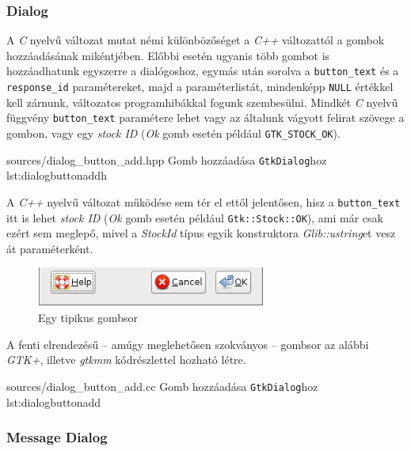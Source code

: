 \subsubsection{Dialog}
\label{sec:dialogbuttonadd}

A \textit{C} nyelvű változat mutat némi különbözőséget a \textit{C++} változattól a gombok hozzáadásának mikéntjében. Előbbi esetén ugyanis több gombot is hozzáadhatunk egyszerre a dialógoshoz, egymás után sorolva a \texttt{button\_text} és a \texttt{response\_id} paramétereket, majd a paraméterlistát, mindenképp \texttt{NULL} értékkel kell zárnunk, változatos programhibákkal fogunk szembesülni. Mindkét \textit{C} nyelvű függvény \texttt{button\_text} paramétere lehet vagy az általunk vágyott felirat szövege a gombon, vagy egy \textit{stock ID} (\textit{Ok} gomb esetén például \texttt{GTK\_STOCK\_OK}).

{sources/dialog_button_add.hpp}
{Gomb hozzáadása \texttt{GtkDialog}hoz}
{lst:dialogbuttonaddh}

A \textit{C++} nyelvű változat működése sem tér el ettől jelentősen, hisz a \texttt{button\_text} itt is lehet \textit{stock ID} (\textit{Ok} gomb esetén például \texttt{Gtk::Stock::OK}), ami már csak ezért sem meglepő, mivel a \textit{StockId} típus egyik konstruktora \textit{Glib::ustring}et vesz át paraméterként.

\begin{figure}[H]
\begin{center}
\includegraphics[height=13mm]{images/button-alternate.png}
\caption{Egy tipikus gombsor}
\end{center}
\end{figure}

A fenti elrendezésű -- amúgy meglehetősen szokványos -- gombsor az alábbi \textit{GTK+}, illetve \textit{gtkmm} kódrészlettel hozható létre.

{sources/dialog_button_add.cc}
{Gomb hozzáadása \texttt{GtkDialog}hoz}
{lst:dialogbuttonadd}

\subsubsection{Message Dialog}
\label{sec:messagedialog}

